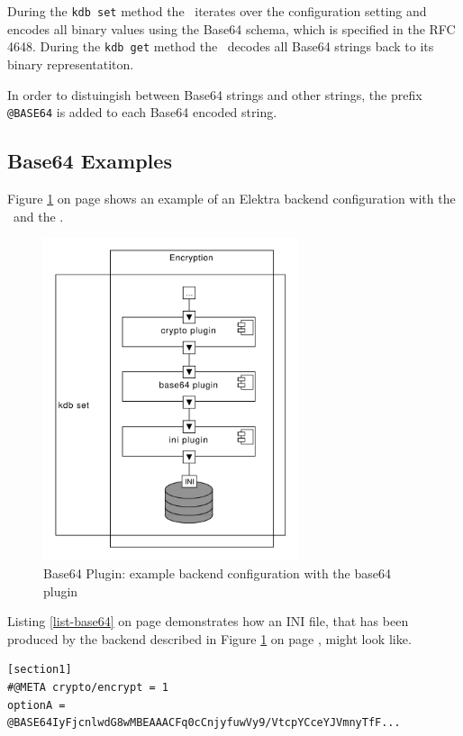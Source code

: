 During the \texttt{kdb set} method the \base ~iterates over the configuration setting and encodes all binary values using the Base64 schema, which is specified in the RFC 4648.\cite{rfc4648}
During the \texttt{kdb get} method the \base ~decodes all Base64 strings back to its binary representatiton.

In order to distuingish between Base64 strings and other strings, the prefix \texttt{@BASE64} is added to each Base64 encoded string. 

\subsection{Base64 Examples}

Figure \ref{impl_base64_overview} on page \pageref{impl_base64_overview} shows an example of an Elektra backend configuration with the \crypto ~and the \base.

\begin{figure}[h]
\center
\caption{Base64 Plugin: example backend configuration with the base64 plugin}
\label{impl_base64_overview}
\includegraphics[width=7.5cm]{umlet-figures/impl_base64_overview.pdf}
\end{figure}

Listing \ref{list-base64} on page \pageref{list-base64} demonstrates how an INI file, that has been produced by the backend described in Figure \ref{impl_base64_overview} on page \pageref{impl_base64_overview}, might look like.

\begin{lstlisting}[label=list-base64,caption={Base64 example INI output}]
[section1]
#@META crypto/encrypt = 1
optionA = @BASE64IyFjcnlwdG8wMBEAAACFq0cCnjyfuwVy9/VtcpYCceYJVmnyTfF...
\end{lstlisting}

